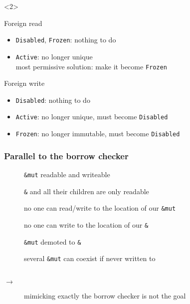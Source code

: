 \begin{frame}[t]
    \begin{onlyenv}<2>
        \begin{block}{Foreign read}
            \begin{itemize}
                \item \texttt{Disabled}, \texttt{Frozen}: nothing to do
                \item \texttt{Active}: no longer unique\\
                      most permissive solution: make it become \texttt{Frozen}
            \end{itemize}
        \end{block}

        \begin{block}{Foreign write}
            \begin{itemize}
                \item \texttt{Disabled}: nothing to do
                \item \texttt{Active}: no longer unique, must become \texttt{Disabled}
                \item \texttt{Frozen}: no longer immutable, must become \texttt{Disabled}
            \end{itemize}
        \end{block}
    \end{onlyenv}
\end{frame}

\begin{frame}
    \frametitle{Parallel to the borrow checker}
    \hspace{-5em}
    \begin{description}
        \item[\cmark] \texttt{\&mut} readable and writeable
        \item[\cmark] \texttt{\&} and all their children are only readable
        \item[\cmark] no one can read/write to the location of our \texttt{\&mut}
        \item[\cmark] no one can write to the location of our \texttt{\&}
        \item[\xmark] \texttt{\&mut} demoted to \texttt{\&}
        \item[\xmark] several \texttt{\&mut} can coexist if never written to
        ~\\~\\
        \item[\(\to\)] mimicking exactly the borrow checker is not the goal
    \end{description}
\end{frame}

